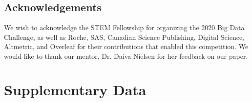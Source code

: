\documentclass[10pt, letterpaper]{article}
\begin{document}
\begin{multicols}{2}
\section*{Acknowledgements}
We wish to acknowledge the STEM Fellowship for organizing the 2020 Big Data Challenge, as well as Roche, SAS, Canadian Science Publishing, Digital Science, Altmetric, and Overleaf for their contributions that enabled this competition. We would like to thank our mentor, Dr. Daiva Nielsen for her feedback on our paper.




\end{multicols}



\clearpage

\section*{Supplementary Data}
\end{document}
